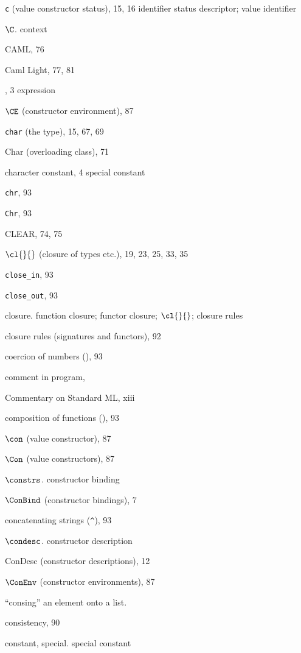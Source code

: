 \begin{theindex}
\item \verb+c+ (value constructor status), 15, 16
\subitem \seealso identifier status descriptor; value identifier
\item $\C$. \see context
\item CAML, 76
\item Caml Light, 77, 81
\item \CASE, 3
\subitem \seealso expression
\item $\CE$ (constructor environment), 87
\item {\tt char} (the type), 15, 67, 69
\item Char (overloading class), 71
\item character constant, 4
\subitem \seealso special constant
\item {\tt chr}, 93
\item {\tt Chr}, 93
\item CLEAR, 74, 75
\item $\cl{}{}$ (closure of types etc.), 19, 23, 25, 33, 35
\item \verb+close_in+, 93
\item \verb+close_out+, 93
\item closure. \see function closure; functor closure; $\cl{}{}$; closure rules
\item closure rules (signatures and functors), 92
\item coercion of numbers (), 93
\item comment in program, \commentrefs
\item Commentary on Standard ML, xiii
\item composition of functions (), 93
\item $\con$ (value constructor), 87
\item $\Con$ (value constructors), 87
\item $\constrs$. \see constructor binding
\item $\ConBind$ (constructor bindings), 7
\item concatenating strings (\verb+^+), 93
\item $\condesc$. \see constructor description
\item ConDesc (constructor descriptions), 12
\item $\ConEnv$ (constructor environments), 87
\item ``consing'' an element onto a list. \see \ml{::}
\item consistency, 90
\item constant, special. \see special constant

\end{theindex}
